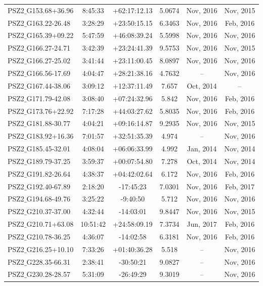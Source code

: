 \documentclass[apj, revtex4]{emulateapj}
\begin{document}
\begin{longtable*}{lccccc}
	PSZ2$\_$G153.68+36.96 & 8:45:33 & +62:17:12.13 & 5.0674 & Nov, 2016 & Nov, 2015 \\
	PSZ2$\_$G163.22-26.48 & 3:28:29 & +23:50:15.15 & 6.3463 & Nov, 2016 & Feb, 2016 \\
	PSZ2$\_$G165.39+09.22 & 5:47:59 & +46:08:39.24 & 5.5998 & Nov, 2016 & Nov, 2016 \\
	PSZ2$\_$G166.27-24.71 & 3:42:39 & +23:24:41.39 & 9.5753 & Nov, 2016 & Nov, 2015 \\
	PSZ2$\_$G166.27-25.02 & 3:41:44 & +23:11:00.45 & 8.0897 & Nov, 2016 & Nov, 2016 \\
	PSZ2$\_$G166.56-17.69 & 4:04:47 & +28:21:38.16 & 4.7632 & -- & Nov, 2016 \\
	PSZ2$\_$G167.44-38.06 & 3:09:12 & +12:37:11.49 & 7.657 & Oct, 2014 & -- \\
	PSZ2$\_$G171.79-42.08 & 3:08:40 & +07:24:32.96 & 5.842 & Nov, 2016 & Feb, 2016 \\
	PSZ2$\_$G173.76+22.92 & 7:17:28 & +44:03:27.62 & 5.8035 & Nov, 2016 & Feb, 2016 \\
	PSZ2$\_$G181.88-30.77 & 4:04:21 & +09:16:14.87 & 9.2935 & Nov, 2016 & Nov, 2015 \\
	PSZ2$\_$G183.92+16.36 & 7:01:57 & +32:51:35.39 & 4.974 & -- & Nov, 2016 \\
	PSZ2$\_$G185.45-32.01 & 4:08:04 & +06:06:33.99 & 4.992 & Jan, 2014 & Nov, 2014 \\
	PSZ2$\_$G189.79-37.25 & 3:59:37 & +00:07:54.80 & 7.278 & Oct, 2014 & Nov, 2014 \\
	PSZ2$\_$G191.82-26.64 & 4:38:37 & +04:42:02.64 & 6.172 & Nov, 2016 & Feb, 2016 \\
	PSZ2$\_$G192.40-67.89 & 2:18:20 & -17:45:23 & 7.0301 & Nov, 2016 & Feb, 2017 \\
	PSZ2$\_$G194.68-49.76 & 3:25:22 & -9:40:50 & 5.712 & Nov, 2016 & Nov, 2016 \\
	PSZ2$\_$G210.37-37.00 & 4:32:44 & -14:03:01 & 9.8447 & Nov, 2016 & Nov, 2015 \\
	PSZ2$\_$G210.71+63.08 & 10:51:42 & +24:58:09.19 & 7.3734 & Jun, 2017 & Feb, 2016 \\
	PSZ2$\_$G210.78-36.25 & 4:36:07 & -14:02:58 & 6.3181 & Nov, 2016 & Feb, 2016 \\
	PSZ2$\_$G216.25+10.10 & 7:33:26 & +01:40:36.28 & 5.518 & -- & Nov, 2016 \\
	PSZ2$\_$G228.35-66.31 & 2:38:41 & -30:50:21 & 9.0827 & -- & Nov, 2016 \\
	PSZ2$\_$G230.28-28.57 & 5:31:09 & -26:49:29 & 9.3019 & -- & Nov, 2016 \\

\end{longtable*}
\end{document}
